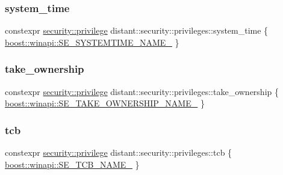 \mbox{\label{namespacedistant_1_1security_1_1privileges_ace0f3a3dd6a72c90cb329c036c923478}} 
\subsubsection{\texorpdfstring{system\+\_\+time}{system\_time}}
{\footnotesize\ttfamily constexpr \mbox{\hyperlink{classdistant_1_1security_1_1privilege}{security\+::privilege}} distant\+::security\+::privileges\+::system\+\_\+time \{ \mbox{\hyperlink{namespaceboost_1_1winapi_aaa97b22aec5300085cbd3261e22eaf05}{boost\+::winapi\+::\+S\+E\+\_\+\+S\+Y\+S\+T\+E\+M\+T\+I\+M\+E\+\_\+\+N\+A\+M\+E\+\_\+}} \}}

\mbox{\label{namespacedistant_1_1security_1_1privileges_abd45a410bde70cc4e405ca6dc19edbd3}} 
\subsubsection{\texorpdfstring{take\+\_\+ownership}{take\_ownership}}
{\footnotesize\ttfamily constexpr \mbox{\hyperlink{classdistant_1_1security_1_1privilege}{security\+::privilege}} distant\+::security\+::privileges\+::take\+\_\+ownership \{ \mbox{\hyperlink{namespaceboost_1_1winapi_a925c0b24f53e681487bb29ab033dabff}{boost\+::winapi\+::\+S\+E\+\_\+\+T\+A\+K\+E\+\_\+\+O\+W\+N\+E\+R\+S\+H\+I\+P\+\_\+\+N\+A\+M\+E\+\_\+}} \}}

\mbox{\label{namespacedistant_1_1security_1_1privileges_ad42ad4716b88acb3557d2b5d67242124}} 
\subsubsection{\texorpdfstring{tcb}{tcb}}
{\footnotesize\ttfamily constexpr \mbox{\hyperlink{classdistant_1_1security_1_1privilege}{security\+::privilege}} distant\+::security\+::privileges\+::tcb \{ \mbox{\hyperlink{namespaceboost_1_1winapi_a622a9fe6dc31d22b90f2c1d3312fb9a9}{boost\+::winapi\+::\+S\+E\+\_\+\+T\+C\+B\+\_\+\+N\+A\+M\+E\+\_\+}} \}}

